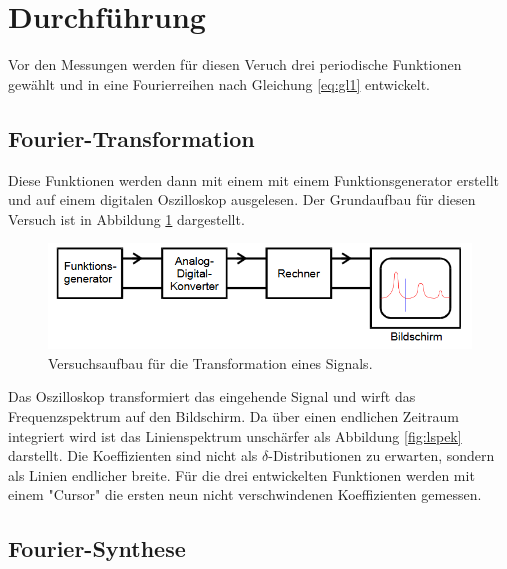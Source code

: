 \section{Durchführung}
\label{sec:Durchführung}
Vor den Messungen werden für diesen Veruch drei periodische Funktionen gewählt und in eine Fourierreihen nach Gleichung \eqref{eq:gl1} entwickelt.
\subsection{Fourier-Transformation}
Diese Funktionen werden dann mit einem mit einem Funktionsgenerator erstellt und auf einem digitalen Oszilloskop ausgelesen.
Der Grundaufbau für diesen Versuch ist in Abbildung \ref{fig:aufbau} dargestellt.
\begin{figure}[H]
    \centering
    \caption{Versuchsaufbau für die Transformation eines Signals.}%
    \label{fig:aufbau}
    \includegraphics[width=\textwidth-20em]{content/aufbau.png}
\end{figure}
\noindent
Das Oszilloskop transformiert das eingehende Signal und wirft das Frequenzspektrum auf den Bildschirm.
Da über einen endlichen Zeitraum integriert wird ist das Linienspektrum unschärfer als Abbildung \ref{fig:lspek} darstellt.
Die Koeffizienten sind nicht als $\delta$-Distributionen zu erwarten, sondern als Linien endlicher breite.
Für die drei entwickelten Funktionen werden mit einem "Cursor" die ersten neun nicht verschwindenen Koeffizienten gemessen.
\subsection{Fourier-Synthese}
